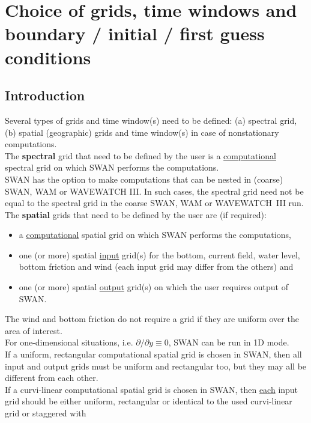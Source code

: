\documentclass[12pt]{book}
\begin{document}
\section{Choice of grids, time windows and boundary / initial / first guess conditions}
\label{sec:choigrd}

\subsection{Introduction}

Several types of grids and time window(s) need to be defined: (a) spectral grid, (b) spatial (geographic)
grids and time window(s) in case of nonstationary computations.
\\[2ex]
\noindent
The {\bf spectral} grid that need to be defined by the user is a \underline{computational} spectral grid on
which SWAN performs the computations.
\\[2ex]
\noindent
SWAN has the option to make computations that can be nested in (coarse) SWAN, WAM or WAVEWATCH
III. In such cases, the spectral grid need not be equal to the spectral grid in the coarse SWAN, WAM or
WAVEWATCH~III run.
\\[2ex]
\noindent
The {\bf spatial} grids that need to be defined by the user are (if required):
\begin{itemize}
 \item a \underline{computational} spatial grid on which SWAN performs the computations,
 \item one (or more) spatial \underline{input} grid(s) for the bottom, current field, water level,
       bottom friction and wind (each input grid may differ from the others) and
 \item one (or more) spatial \underline{output} grid(s) on which the user requires output of SWAN.
\end{itemize}
The wind and bottom friction do not require a grid if they are uniform over the area of interest.
\\[2ex]
\noindent
For one-dimensional situations, i.e. $\partial /\partial y \equiv 0$, SWAN can be run in 1D mode.
\\[2ex]
\noindent
If a uniform, rectangular computational spatial grid is chosen in SWAN, then all input and output
grids must be uniform and rectangular too, but they may all be different from each other.
\\[2ex]
\noindent
If a curvi-linear computational spatial grid is chosen in SWAN, then \underline{each} input grid
should be either uniform, rectangular or identical to the used curvi-linear grid or staggered with
\end{document}
